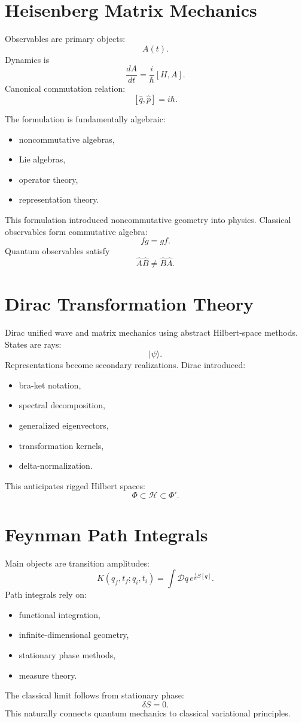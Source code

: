 \section{Heisenberg Matrix Mechanics}
\label{qmf:mm}
Observables are primary objects:
\[A(t).\]
Dynamics is
\[\frac{dA}{dt}=\frac{i}{\hbar}[H,A].\]
Canonical commutation relation:
\[[\hat q,\hat p]=i\hbar.\]

The formulation is fundamentally algebraic:
\begin{itemize}
\item noncommutative algebras,
\item Lie algebras,
\item operator theory,
\item representation theory.
\end{itemize}
This formulation introduced noncommutative geometry into physics.
Classical observables form commutative algebra:
\[fg = gf.\]
Quantum observables satisfy
\[\hat A \hat B \neq \hat B \hat A.\]

\section{Dirac Transformation Theory}
\label{qmf:dtt}
Dirac unified wave and matrix mechanics using abstract Hilbert-space methods.
States are rays:
\[|\psi\rangle.\]
Representations become secondary realizations.
Dirac introduced:
\begin{itemize}
\item bra-ket notation,
\item spectral decomposition,
\item generalized eigenvectors,
\item transformation kernels,
\item delta-normalization.
\end{itemize}
This anticipates rigged Hilbert spaces:
\[\Phi \subset \mathcal H \subset \Phi'.\]

\section{Feynman Path Integrals}
\label{qmf:pi}
Main objects are transition amplitudes:
\[K(q_f,t_f;q_i,t_i)=\int \mathcal Dq \,e^{\frac{i}{\hbar}S[q]}.\]
Path integrals rely on:
\begin{itemize}
\item functional integration,
\item infinite-dimensional geometry,
\item stationary phase methods,
\item measure theory.
\end{itemize}
The classical limit follows from stationary phase:
\[\delta S = 0.\]
This naturally connects quantum mechanics to classical variational principles.
